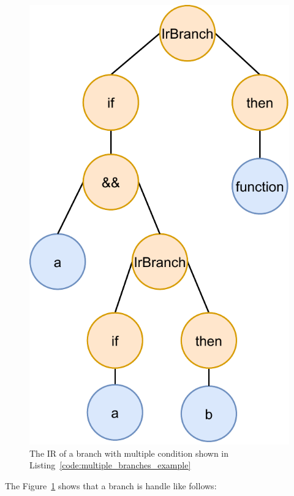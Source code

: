\begin{figure}[!ht]
    \centering
    \includegraphics[scale=0.75]{document/chapters/3-alignment/images/ir_representation_branches.pdf}
    \caption{The IR of a branch with multiple condition shown in Listing~\ref{code:multiple_branches_example}}
    \label{fig:multiple_branches_ir_example}
\end{figure}
The Figure~\ref{fig:multiple_branches_ir_example} shows that a branch is handle like follows:
